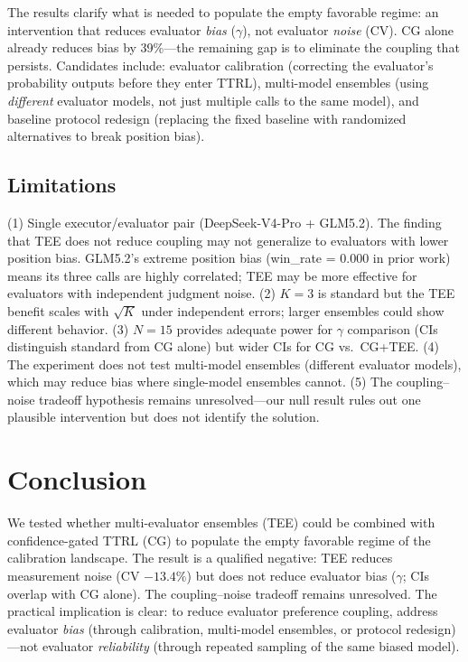 \documentclass[11pt]{article}
\begin{document}
The results clarify what is needed to populate the empty favorable regime: an intervention that reduces evaluator \textit{bias} ($\gamma$), not evaluator \textit{noise} (CV). CG alone already reduces bias by 39\%---the remaining gap is to eliminate the coupling that persists. Candidates include: evaluator calibration (correcting the evaluator's probability outputs before they enter TTRL), multi-model ensembles (using \textit{different} evaluator models, not just multiple calls to the same model), and baseline protocol redesign (replacing the fixed baseline with randomized alternatives to break position bias).

\subsection{Limitations}

(1) Single executor/evaluator pair (DeepSeek-V4-Pro + GLM5.2). The finding that TEE does not reduce coupling may not generalize to evaluators with lower position bias. GLM5.2's extreme position bias (win\_rate = 0.000 in prior work) means its three calls are highly correlated; TEE may be more effective for evaluators with independent judgment noise. (2) $K{=}3$ is standard but the TEE benefit scales with $\sqrt{K}$ under independent errors; larger ensembles could show different behavior. (3) $N{=}15$ provides adequate power for $\gamma$ comparison (CIs distinguish standard from CG alone) but wider CIs for CG vs.\ CG+TEE. (4) The experiment does not test multi-model ensembles (different evaluator models), which may reduce bias where single-model ensembles cannot. (5) The coupling--noise tradeoff hypothesis remains unresolved---our null result rules out one plausible intervention but does not identify the solution.

\section{Conclusion}

We tested whether multi-evaluator ensembles (TEE) could be combined with confidence-gated TTRL (CG) to populate the empty favorable regime of the calibration landscape. The result is a qualified negative: TEE reduces measurement noise (CV $-13.4\%$) but does not reduce evaluator bias ($\gamma$; CIs overlap with CG alone). The coupling--noise tradeoff remains unresolved. The practical implication is clear: to reduce evaluator preference coupling, address evaluator \textit{bias} (through calibration, multi-model ensembles, or protocol redesign)---not evaluator \textit{reliability} (through repeated sampling of the same biased model).
\end{document}
